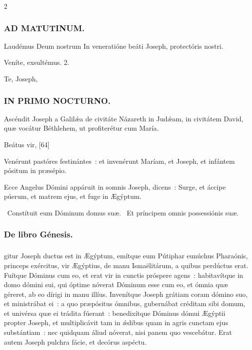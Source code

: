 \documentclass[9pt,twoside]{extarticle}
\begin{document}
\begin{multicols}{2}
{\subsubsection*{\center \textsc{AD MATUTINUM.}}
\begin{tightlist}{}
\item {} Laudémus Deum nostrum \textred{*} In veneratióne beáti Joseph, protectóris nostri.
\item {} Veníte, exsultémus. 2.
\item {} Te, Joseph, 
\end{tightlist}

\subsubsection*{\center \textsc{IN PRIMO NOCTURNO.}}
\begin{tightlist}{}
\item {} Ascéndit Joseph a Galilǽa de civitáte Názareth in Judǽam, in civitátem David, quæ vocátur Béthlehem, ut profiterétur cum María.
\item {} Beátus vir,  [64]
\item {} Venérunt pastóres festinántes~: et invenérunt Maríam, et Joseph, et infántem pósitum in præsépio.
\item {} Ecce Angelus Dómini appáruit in somnis Joseph, dicens~: Surge, et áccipe púerum, et matrem ejus, et fuge in Ægýptum.
\item {}~Constítuit eum Dóminum domus suæ. ~Et príncipem omnis possessiónis suæ.
\item {}
\end{tightlist}

\subsubsection*{\center De libro Génesis.}
\subsubsection*{\center {}}
gitur Joseph ductus est in Ægýptum, emítque eum Pútiphar eunúchus Pharaónis, princeps exércitus, vir Ægýptius, de manu Ismaëlitárum, a quibus perdúctus erat.
Fuítque Dóminus cum eo, et erat vir in cunctis próspere agens~: habitavítque in domo dómini sui,
qui óptime nóverat Dóminum esse cum eo, et ómnia quæ géreret, ab eo dírigi in manu illíus.
Invenítque Joseph grátiam coram dómino suo, et ministrábat ei~: a quo præpósitus ómnibus, gubernábat créditam sibi domum, et univérsa quæ ei trádita fúerant~:
benedixítque Dóminus dómui Ægýptii propter Joseph, et multiplicávit tam in ǽdibus quam in agris cunctam ejus substántiam~:
nec quidquam áliud nóverat, nisi panem quo vescebátur. Erat autem Joseph pulchra fácie, et decórus aspéctu.

}
\end{multicols}
\end{document}
